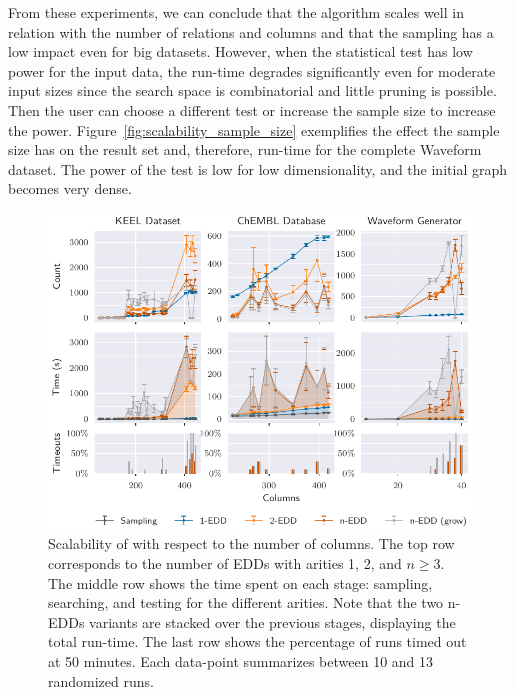 From these experiments, we can conclude that the algorithm scales well in relation with the number of
relations and columns and that the sampling has a low impact even for big datasets.
However, when the statistical test has low power for the input data, the run-time degrades
significantly even for moderate input sizes since the search space is combinatorial and little
pruning is possible. Then the user can choose a different test or increase the sample size to increase the
power. Figure~\ref{fig:scalability_sample_size} exemplifies the effect the sample size has on the result
set and, therefore, run-time for the complete Waveform dataset. The power of the test is low for low
dimensionality, and the initial graph becomes very dense.

\begin{figure}[htb]
    \centering
    \includegraphics{images/5_presq/scalability}
    \caption[Scalability of \PresQ with respect to the number of columns.]{
        Scalability of \PresQ with respect to the number of columns.
        The top row corresponds to the number of \glspl{EDD} with arities 1, 2, and $n \ge 3$.
        The middle row shows the time spent on each stage: sampling, searching, and testing for the different arities.
        Note that the two n-EDDs variants are stacked over the previous stages, displaying the total run-time.
        The last row shows the percentage of runs timed out at 50 minutes.
        Each data-point summarizes between 10 and 13 randomized runs.
    }
    \label{fig:scalability}
\end{figure}

